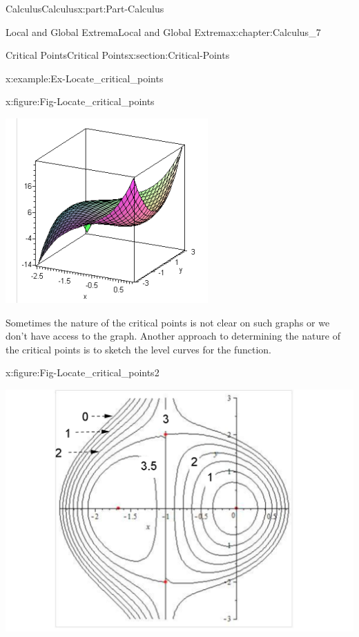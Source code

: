 \documentclass[oneside,10pt,]{book}
\numberwithin{equation}{section}
\begin{document}
\begin{partptx}{Calculus}{}{Calculus}{}{}{x:part:Part-Calculus}
\begin{chapterptx}{Local and Global Extrema}{}{Local and Global Extrema}{}{}{x:chapter:Calculus_7}
\begin{sectionptx}{Critical Points}{}{Critical Points}{}{}{x:section:Critical-Points}
\begin{example}{}{x:example:Ex-Locate_critical_points}
\begin{figureptx}{}{x:figure:Fig-Locate_critical_points}{}
\begin{image}{0.1}{0.8}{0.1}
\includegraphics[width=\linewidth]{./Calculus/Images/7/Fig4-Locate_critical_points.png}
\end{image}%
\tcblower
\end{figureptx}%
Sometimes the nature of the critical points is not clear on such graphs or we don’t have access to the graph. Another approach to determining the nature of the critical points is to sketch the level curves for the function.%
\begin{figureptx}{}{x:figure:Fig-Locate_critical_points2}{}%
\begin{image}{0.1}{0.8}{0.1}%
\includegraphics[width=\linewidth]{./Calculus/Images/7/Fig5-Locate_critical_points.png}

\end{image}
\end{figureptx}
\end{example}
\end{sectionptx}
\end{chapterptx}
\end{partptx}
\end{document}
